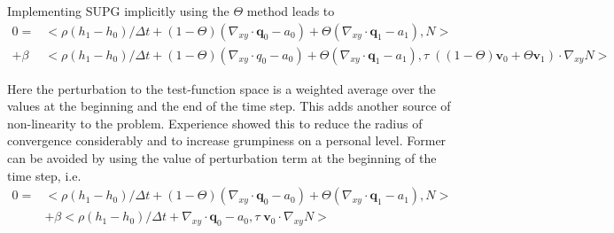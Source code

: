 \documentclass[10pt,a4paper]{book}
\newcommand{\p}{\partial}
\begin{document}
Implementing SUPG implicitly using the $\Theta$ method leads to
\begin{align*}
0=  &<\rho (h_1-h_0)/\Delta t + (1-\Theta) (\nabla_{xy} \cdot \bm{q}_0  - a_0)  + \Theta (\nabla_{xy} \cdot \bm{q}_1  - a_1) , N  >\\
  + \beta   &<\rho (h_1-h_0)/\Delta t  + (1-\Theta) (  \nabla_{xy} \cdot q_0 -a_0)
  + \Theta (\nabla_{xy} \cdot \bm{q}_1 -a_1) , \tau \; ((1-\Theta) \bm{v}_0 +\Theta \bm{v}_1 ) \cdot \nabla_{xy} N  >
\end{align*}

Here the perturbation to the test-function space is a weighted average
over the values at the beginning and the end of the time step. This
adds another source of non-linearity to the problem. Experience showed
this to reduce the radius of convergence considerably and to increase
grumpiness on a personal level. Former can be avoided by using the
value of perturbation term at the beginning of the time step, i.e.\
\begin{align*}
0=  &<\rho (h_1-h_0)/\Delta t + (1-\Theta) (\nabla_{xy} \cdot \bm{q}_0  - a_0)  + \Theta (\nabla_{xy} \cdot \bm{q}_1  - a_1) , N  >\\
  & + \beta   <\rho (h_1-h_0)/\Delta t  +   \nabla_{xy} \cdot \bm{q}_0 -a_0 , \tau \; \bm{v}_0  \cdot \nabla_{xy} N  >
\end{align*}





\end{document}
